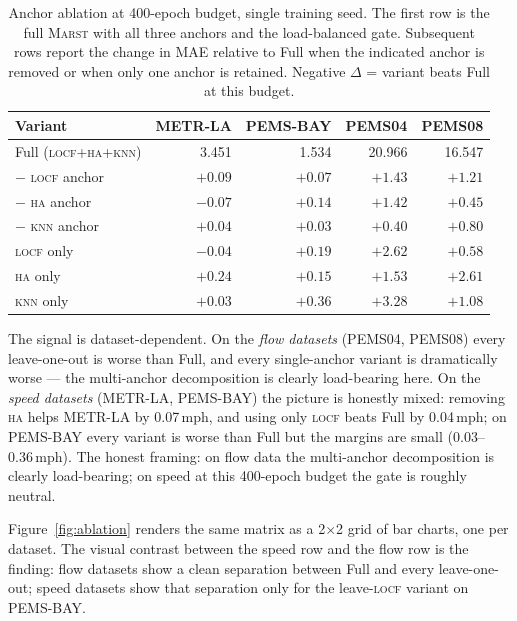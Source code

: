 \documentclass[11pt]{article}
\newcommand{\MARST}{\textsc{Marst}\xspace}
\newcommand{\LOCF}{\textsc{locf}\xspace}
\newcommand{\HA}{\textsc{ha}\xspace}
\newcommand{\KNN}{\textsc{knn}\xspace}
\begin{document}
\begin{table}[!htbp]
\centering
\caption{Anchor ablation at 400-epoch budget, single training seed.
The first row is the full \MARST with all three anchors and the
load-balanced gate.  Subsequent rows report the change in MAE relative
to Full when the indicated anchor is removed or when only one anchor
is retained.  Negative $\Delta$ = variant beats Full at this budget.}
\label{tab:ablation}
\small
\begin{tabular}{lrrrr}
\toprule
\textbf{Variant} & \textbf{METR-LA} & \textbf{PEMS-BAY} & \textbf{PEMS04} & \textbf{PEMS08} \\
\midrule
Full (\LOCF{}+\HA{}+\KNN) & 3.451 & 1.534 & 20.966 & 16.547 \\
$-$ \LOCF anchor          & $+0.09$ & $+0.07$ & $+1.43$ & $+1.21$ \\
$-$ \HA anchor            & $-0.07$ & $+0.14$ & $+1.42$ & $+0.45$ \\
$-$ \KNN anchor           & $+0.04$ & $+0.03$ & $+0.40$ & $+0.80$ \\
\LOCF only                & $-0.04$ & $+0.19$ & $+2.62$ & $+0.58$ \\
\HA only                  & $+0.24$ & $+0.15$ & $+1.53$ & $+2.61$ \\
\KNN only                 & $+0.03$ & $+0.36$ & $+3.28$ & $+1.08$ \\
\bottomrule
\end{tabular}
\end{table}

The signal is dataset-dependent.  On the \emph{flow datasets} (PEMS04,
PEMS08) every leave-one-out is worse than Full, and every
single-anchor variant is dramatically worse --- the multi-anchor
decomposition is clearly load-bearing here.  On the \emph{speed
datasets} (METR-LA, PEMS-BAY) the picture is honestly mixed: removing
\HA helps METR-LA by 0.07\,mph, and using only \LOCF beats Full by
0.04\,mph; on PEMS-BAY every variant is worse than Full but the
margins are small (0.03--0.36\,mph).  The honest framing: on flow data
the multi-anchor decomposition is clearly load-bearing; on speed at
this 400-epoch budget the gate is roughly neutral.

Figure~\ref{fig:ablation} renders the same matrix as a 2$\times$2 grid
of bar charts, one per dataset.  The visual contrast between the speed
row and the flow row is the finding: flow datasets show a clean
separation between Full and every leave-one-out; speed datasets show
that separation only for the leave-\LOCF variant on PEMS-BAY.
\end{document}
